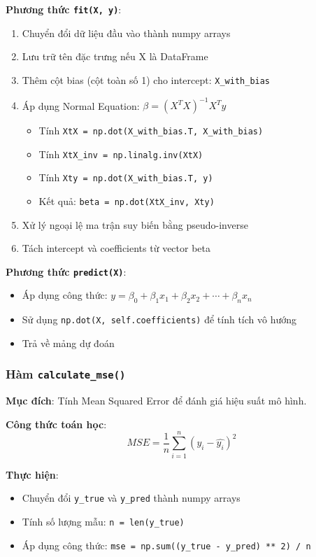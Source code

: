\textbf{Phương thức \texttt{fit(X, y)}}:
\begin{enumerate}
	\item Chuyển đổi dữ liệu đầu vào thành numpy arrays
	\item Lưu trữ tên đặc trưng nếu X là DataFrame
	\item Thêm cột bias (cột toàn số 1) cho intercept: \texttt{X\_with\_bias}
	\item Áp dụng Normal Equation: \(\beta = {(X^{T}X)}^{-1}X^{T}y\)
	      \begin{itemize}
		      \item Tính \texttt{XtX = np.dot(X\_with\_bias.T, X\_with\_bias)}
		      \item Tính \texttt{XtX\_inv = np.linalg.inv(XtX)}
		      \item Tính \texttt{Xty = np.dot(X\_with\_bias.T, y)}
		      \item Kết quả: \texttt{beta = np.dot(XtX\_inv, Xty)}
	      \end{itemize}
	\item Xử lý ngoại lệ ma trận suy biến bằng pseudo-inverse
	\item Tách intercept và coefficients từ vector beta
\end{enumerate}

\textbf{Phương thức \texttt{predict(X)}}:
\begin{itemize}
	\item Áp dụng công thức: \(y = \beta_0 + \beta_1x_1 + \beta_2x_2 + \cdots + \beta_{n}x_{n}\)
	\item Sử dụng \texttt{np.dot(X, self.coefficients)} để tính tích vô hướng
	\item Trả về mảng dự đoán
\end{itemize}

\subsubsection{Hàm \texttt{calculate\_mse()}}
\textbf{Mục đích}: Tính Mean Squared Error để đánh giá hiệu suất mô hình.

\textbf{Công thức toán học}:
\[MSE = \frac{1}{n}\sum_{i=1}^{n}{(y_i - \hat{y_i})}^2\]

\textbf{Thực hiện}:
\begin{itemize}
	\item Chuyển đổi \texttt{y\_true} và \texttt{y\_pred} thành numpy arrays
	\item Tính số lượng mẫu: \texttt{n = len(y\_true)}
	\item Áp dụng công thức: \texttt{mse = np.sum((y\_true - y\_pred) ** 2) / n}
\end{itemize}

